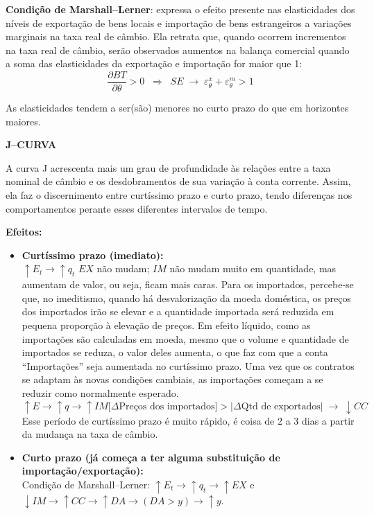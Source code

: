 \documentclass[a4paper,12pt]{article}[abntex2]
\begin{document}
\textbf{Condição de Marshall–Lerner}: expressa o efeito presente nas elasticidades dos níveis de exportação de bens locais e importação de bens estrangeiros a variações marginais na taxa real de câmbio. Ela retrata que, quando ocorrem incrementos na taxa real de câmbio, serão observados aumentos na balança comercial quando a soma das elasticidades da exportação e importação for maior que 1:
\[
\frac{\partial BT}{\partial \theta} > 0
\;\;\Longrightarrow\;\;
SE \;\to\; \varepsilon^{x}_{\theta} + \varepsilon^{m}_{\theta} > 1
\]

As elasticidades tendem a ser(são) menores no curto prazo do que em horizontes maiores.

\textbf{J–CURVA}

A curva J acrescenta mais um grau de profundidade às relações entre a taxa nominal de câmbio e os desdobramentos de sua variação à conta corrente. Assim, ela faz o discernimento entre curtíssimo prazo e curto prazo, tendo diferenças nos comportamentos perante esses diferentes intervalos de tempo.

\textbf{Efeitos:}

\begin{itemize}
  \item \textbf{Curtíssimo prazo (imediato):}\\
    \(\uparrow E_t \to \uparrow q_t\) \rightarrow \(EX\) não mudam; \(IM\) não mudam muito em quantidade, mas aumentam de valor, ou seja, ficam mais caras.
    Para os importados, percebe‐se que, no imeditismo, quando há desvalorização da moeda doméstica, os preços dos importados irão se elevar e a quantidade importada será reduzida em pequena proporção à elevação de preços. Em efeito líquido, como as importações são calculadas em moeda, mesmo que o volume e quantidade de importados se reduza, o valor deles aumenta, o que faz com que a conta “Importações” seja aumentada no curtíssimo prazo. Uma vez que os contratos se adaptam às novas condições cambiais, as importações começam a se reduzir como normalmente esperado.  
    \[
    \uparrow E \to \uparrow q \to \uparrow IM \bigl[\Delta\text{Preços dos importados}\bigr] > \lvert \Delta\text{Qtd de exportados}\rvert \;\to\; \downarrow CC
    \]
    Esse período de curtíssimo prazo é muito rápido, é coisa de 2 a 3 dias a partir da mudança na taxa de câmbio.
  \item \textbf{Curto prazo (já começa a ter alguma substituição de importação/exportação):}\\
    Condição de Marshall–Lerner: \(\uparrow E_t \to \uparrow q_t \to \uparrow EX\) e \(\downarrow IM \to \uparrow CC \to \uparrow DA \to (DA > y) \to \uparrow y\).
\end{itemize}
\end{document}
